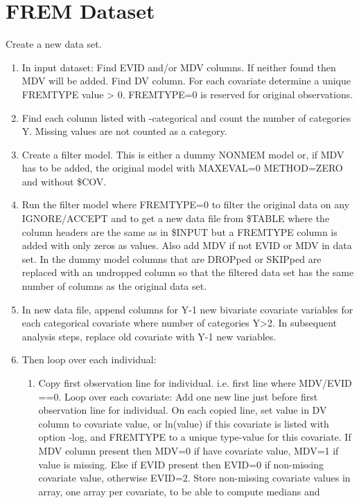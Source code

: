 \section{FREM Dataset}
Create a new data set.
\begin{enumerate} 
	\item In input dataset: Find EVID and/or MDV columns. If neither found then MDV will be added. Find DV column.
    For each covariate  determine a unique %
    FREMTYPE value %
    > 0.
    FREMTYPE=0 is reserved for original observations.
    \item Find each column listed with -categorical and count the number of categories Y. Missing values are not counted as
    a category. 
    \item Create a filter model. This is either a dummy NONMEM model or, if MDV has to be added,
    the original model with MAXEVAL=0 METHOD=ZERO and without \$COV.
	\item Run the filter model where FREMTYPE=0 to filter the original data on any IGNORE/ACCEPT and to get a new data file
    from \$TABLE where the column headers are the same as in \$INPUT but a FREMTYPE column is added with only zeros as values.
    Also add MDV if not EVID or MDV in data set. In the dummy model columns that are DROPped or SKIPped are replaced with an undropped column so that the filtered data set has the same number of columns as the original data set.
    \item  In new data file, append columns for Y-1 new bivariate covariate variables for each
          categorical covariate where number of categories Y>2. In subsequent analysis steps, replace old covariate with
          Y-1 new variables.
\item Then loop over each individual: 
\begin{enumerate}
	\item Copy first observation line for individual. i.e. first line where MDV/EVID ==0. 
Loop over each covariate: Add one %
new line %
just before first observation line for individual. 
On each copied line, set value in DV column to covariate value, or ln(value) if this covariate is listed with option -log,
and FREMTYPE to a unique type-value for this covariate. %
If MDV column present then MDV=0 if have covariate value, MDV=1 if value is missing. 
Else if EVID present then EVID=0 if non-missing covariate value, otherwise EVID=2. 
Store non-missing covariate values in array, one array per covariate, to be able to compute medians and 

\end{enumerate}
\end{enumerate}
